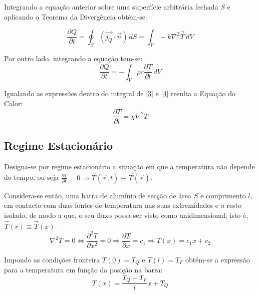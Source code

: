 \documentclass[9pt]{extarticle}
\begin{document}
\begin{multicols}{2}
Integrando a equação anterior sobre uma superfície arbitrária fechada $S$ e aplicando o Teorema da Divergência obtém-se:

\begin{equation} \label{3}
\frac{\partial Q}{\partial t} = \oint_S (\vec{j_Q} \cdot \vec{n}) \,dS = \int_V - k \nabla^2 \vec{T} \,dV
\end{equation}

Por outro lado, integrando a equação \label{calor} tem-se:
\begin{equation} \label{4}
\frac{\partial Q}{\partial t} = - \int_V \rho c \frac{\partial T}{\partial t} \,dV
\end{equation}

Igualando as expressões dentro do integral de \ref{3} e \ref{4} resulta a Equação do Calor:
\begin{equation}
\frac{\partial T}{\partial t} = \chi \nabla^2 T 
\end{equation}
\begin{center}
\par{}
\end{center}

\subsection*{Regime Estacionário}
\par Designa-se por regime estacionário a situação em que a temperatura não depende do tempo, ou seja $\frac{\partial T}{\partial t} = 0 \Rightarrow \vec{T}(\vec{r},t) \equiv \vec{T}(\vec{r})$.
\par Considera-se então, uma barra de alumínio de secção de área $S$ e comprimento $l$, em contacto com duas fontes de temperatura nas suas extremidades e o resto isolado, de modo a que, o seu fluxo possa ser visto como unidimensional, isto é, $\vec{T}(r) \equiv \vec{T}(x)$.
\begin{equation}
\nabla^2 T = 0 \Leftrightarrow \frac{\partial ^2 T}{\partial x^2} = 0 \Rightarrow \frac{\partial T}{\partial x} = c_1 \Rightarrow T(x) = c_1 x + c_2
\end{equation}

Impondo as condições fronteira $T(0) = T_{Q}$ e $T(l) = T_{F}$ obtém-se a expressão para a temperatura em função da posição na barra: 
\begin{equation}
T(x) = \frac{T_ {Q} - T_{F}}{l}x + T_{Q}
\end{equation}


\end{multicols}
\end{document}

